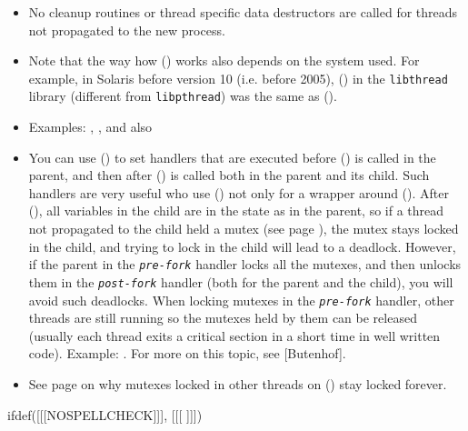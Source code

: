 \begin{itemize}
\item No cleanup routines or thread specific data destructors are called for
threads not propagated to the new process.
\item \label{FORKALL} Note that the way how () works also depends on
the system used.  For example, in Solaris before version 10 (i.e. before 2005),
() in the \texttt{libthread} library (different from
\texttt{libpthread}) was the same as ().
\item Examples: ,
, and also 
\item \label{ATFORK} You can use () to set handlers that
are executed before () is called in the parent, and then after
() is called both in the parent and its child.  Such handlers are
very useful who use () not only for a wrapper around ().
After (), all variables in the child are in the state as in the
parent, so if a thread not propagated to the child held a mutex (see page
\pageref{MUTEXES}), the mutex stays
locked in the child, and trying to lock in the child will lead to a deadlock.
However, if the parent in the \emph{\texttt{pre-fork}} handler locks all the
mutexes, and then unlocks them in the \emph{\texttt{post-fork}} handler (both
for the parent and the child), you will avoid such deadlocks.  When locking
mutexes in the \emph{\texttt{pre-fork}} handler, other threads are still running
so the mutexes held by them can be released (usually each thread exits a
critical section in a short time in well written code).
Example: .  For more on this topic, see [Butenhof].
\item See page \pageref{MUTEXES} on why mutexes locked in other threads on
() stay locked forever.
\end{itemize}


ifdef([[[NOSPELLCHECK]]], [[[
]]])

